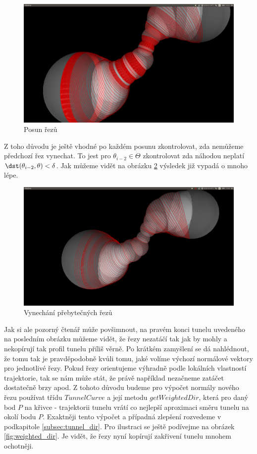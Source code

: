 \begin{figure}
    \centering
    \includegraphics[width=\textwidth]{img/shift_cuts.png}
    \caption{Posun řezů}
  \centering
  \label{fig:shift_cuts}
\end{figure}

Z toho důvodu je ještě vhodné po každém posunu zkontrolovat, zda nemůžeme předchozí
řez vynechat. To jest pro $ \theta_{i - 2} \in \Theta $ zkontrolovat zda
náhodou neplatí $ \dst(\theta_{i - 2}, \theta) < \delta $. Jak můžeme vidět na
obrázku \ref{fig:cuts_with_replace} výsledek již vypadá o mnoho lépe.

\begin{figure}
    \centering
    \includegraphics[width=\textwidth]{img/cuts_with_replace.png}
    \caption{Vynechání přebytečných řezů}
  \centering
  \label{fig:cuts_with_replace}
\end{figure}

Jak si ale pozorný čtenář může povšimnout, na pravém konci tunelu uvedeného na
posledním obrázku můžeme vidět, že řezy nezatáčí tak jak by mohly a nekopírují tak
profil tunelu příliš věrně. Po krátkém zamyšlení se dá nahlédnout, že tomu tak
je pravděpodobně kvůli tomu, jaké volíme výchozí normálové vektory pro jednotlivé
řezy. Pokud řezy orientujeme výhradně podle lokálních vlastností trajektorie,
tak se nám může stát, že právě například nezačneme zatáčet dostatečně brzy apod.
Z tohoto důvodu budeme pro výpočet normály nového řezu používat třídu
$ TunnelCurve $ a její metodu $ getWeightedDir $, která pro daný bod $ P $ na křivce
- trajektorii tunelu vrátí co nejlepší aproximaci směru tunelu na okolí bodu $ P $.
Exaktněji tento výpočet a případná zlepšení rozvedeme v podkapitole \ref{subsec:tunnel_dir}.
Pro ilustraci se ještě podívejme na obrázek \ref{fig:weighted_dir}. Je vidět, že
řezy nyní kopírují zakřivení tunelu mnohem ochotněji.

